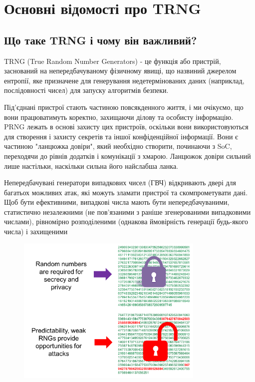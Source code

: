 
\chapter{Основні відомості про TRNG}
\label{chap:review}  %

\section{Що таке TRNG і чому він важливий?}

TRNG (True Random Number Generators) - це функція або пристрій, заснований на непередбачуваному фізичному явищі, що назвиний джерелом ентропії, яке призначене для генерування недетермінованих даних (наприклад, послідовності чисел) для запуску алгоритмів безпеки.

Під'єднані пристрої стають частиною повсякденного життя, і ми очікуємо, що вони працюватимуть коректно, захищаючи ділову та особисту інформацію. PRNG лежать в основі захисту цих пристроїв, оскільки вони використовуються для створення і захисту секретів та іншої конфіденційної інформації. Вони є частиною "ланцюжка довіри", який необхідно створити, починаючи з SoC, переходячи до рівнів додатків і комунікації з хмарою. Ланцюжок довіри сильний лише настільки, наскільки сильна його найслабша ланка.

Непередбачувані генератори випадкових чисел (ГВЧ) відкривають двері для багатьох можливих атак, які можуть зламати пристрої та скомпрометувати дані. Щоб бути ефективними, випадкові числа мають бути непередбачуваними, статистично незалежними (не пов'язаними з раніше згенерованими випадковими числами), рівномірно розподіленими (однакова ймовірність генерації будь-якого числа) і захищеними 


\begin{figure}[h]
  \centering
  \includegraphics[width=0.8\textwidth]{IMAGES/01.png}
  \label{fig:fig1}
\end{figure}


